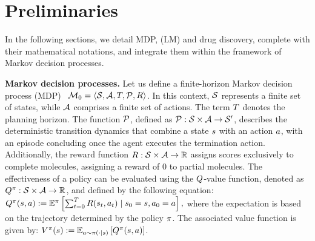 \section{Preliminaries}

In the following sections, we detail MDP,  (LM) and drug discovery, complete with their mathematical notations, and integrate them within the framework of Markov decision processes.



\textbf{Markov decision processes.}
Let us define a finite-horizon Markov decision process (MDP)~\citep{puterman2014markov} $\mathcal{M}_0 = \langle \mathcal{S}, \mathcal{A},T,\mathcal{P},R \rangle$.
In this context, $\mathcal{S}$ represents a finite set of states, while $\mathcal{A}$ comprises a finite set of actions. The term $T$ denotes the planning horizon. The function $\mathcal{P}$, defined as $\mathcal{P}: \mathcal{S} \times \mathcal{A} \rightarrow \mathcal{S}'$, describes the deterministic transition dynamics that combine a state $s$ with an action $a$, with an episode concluding once the agent executes the termination action. Additionally, the reward function $R: \mathcal{S} \times \mathcal{A} \rightarrow \mathbb{R}$ assigns scores exclusively to complete molecules, assigning a reward of 0 to partial molecules.
The effectiveness of a policy can be evaluated using the $Q$-value function, denoted as $Q^{\pi}: \mathcal{S} \times \mathcal{A} \rightarrow \mathbb{R}$, and defined by the following equation:
$Q^{\pi}(s, a) := \mathbb{E}^{\pi}\left[\sum_{t=0}^{T}R(s_t, a_t) \mid s_0 = s, a_0 = a\right],$
where the expectation is based on the trajectory determined by the policy $\pi$. The associated value function is given by:
$V^{\pi}(s) := \mathbb{E}_{a \sim \pi(\cdot|s)}\left[Q^{\pi}(s, a)\right]$.




